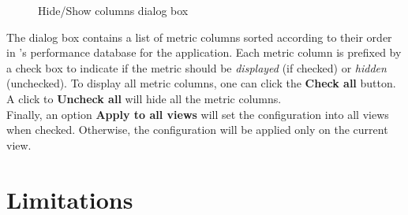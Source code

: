 \begin{figure}[t]
\caption{Hide/Show columns dialog box}
\end{figure}

 The dialog box contains a list of metric columns sorted according to their order in \HPCToolkit{}'s performance database for the application. Each metric column is prefixed by a check box to indicate if the metric should be \textit{displayed} (if checked) or \textit{hidden} (unchecked). To display all metric columns, one can click the \textbf{Check all} button. A click to \textbf{Uncheck all} will hide all the metric columns.
\\ Finally, an option \textbf{Apply to all views} will set the configuration into all views when checked.
Otherwise, the configuration will be applied only on the current view.



\section{Limitations}

